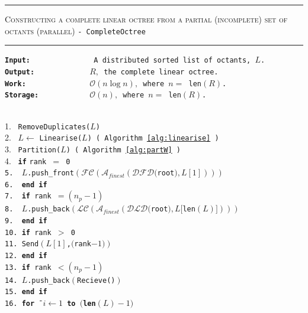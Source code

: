 \begin{table} 
\centering
\rule{\textwidth}{0.01mm}
\begin{algorithm}{ \textsc{Constructing a complete linear octree from a partial (incomplete) set of octants (parallel)} \tt{- CompleteOctree}}
\rule{\textwidth}{0.01mm}
\flushleft
\tt{\bf{Input:~~~~~~~~~~~~~~}} A distributed sorted list of octants, $L$.\\
\tt{\bf{Output:~~~~~~~~~~~~}} $R,$ the complete linear octree.\\
\tt{\bf{Work:~~~~~~~~~~~~~~}} $\mathcal{O}(n\log n),$ where $n = $ len$(R)$.\\
\tt{\bf{Storage:~~~~~~~~~~~}} $\mathcal{O}(n),$ where $n = $ len$(R)$.\\
  ~\\
\begin{tabbing}    
  1.~ {\tt RemoveDuplicates($L$) }\\
  2.~ $L \leftarrow$ {\tt Linearise($L$) ( Algorithm \ref{alg:linearise} )}\\
  3.~ {\tt Partition($L$) ( Algorithm \ref{alg:partW} )}\\
  4.~ {\tt \bf if} \= \tt{rank }$=$ \tt{0}\\
  5.~ \> $L$\tt{.push\_front}$\left(\mathcal{FC}\left(\mathcal{A}_{finest}\left(\mathcal{DFD}(\right.\right.\right.$\tt{root}$\left.\left.\left.),L[1]\right)\right)\right)$\\
  6.~ \tt{\bf{end if}}\\
  7.~ {\tt \bf if} \= \tt{rank} $= (n_p - 1)$\\
8.~ \> $L$\tt{.push\_back}$\left(\mathcal{LC}\left(\mathcal{A}_{finest}\left(\mathcal{DLD}(\right.\right.\right.$\tt{root}$),L[$len$\left.\left.\left.(L)]\right)\right)\right)$\\
9.~ \tt{\bf{end if}}\\
10. {\tt \bf if} \= \tt{rank }$>$ \tt{0}\\
11. \> \tt{Send$\left(L[1]\right.$,$($rank$-1)\left.\right)$ }\\
12. \tt{\bf{end if}}\\
13. {\tt \bf if} \= \tt{rank} $< (n_p - 1)$\\
14. \> $L$\tt{.push\_back}$\left(\right.$Recieve()$\left.\right)$\\
15. \tt{\bf{end if}}\\
16. {\tt \bf for} \= $i \leftarrow 1$ \bf{to} \tt{$($len$(L)-1)$}\\

\end{tabbing}
\end{algorithm}
\end{table}

